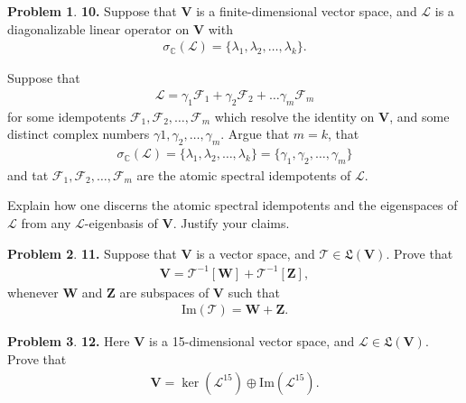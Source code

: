 \documentclass{book}
\theoremstyle{definition}
\newtheorem*{prob*}{Problem}
\newcommand{\F}{\mathcal{F}}
\newcommand{\V}{\mathbf{V}}
\newcommand{\W}{\mathbf{W}}
\newcommand{\Z}{\mathbf{Z}}
\newcommand{\lag}{\mathcal{L}}
\newcommand{\ima}{\text{Im}}
\newcommand{\T}{\mathcal{T}}
\newcommand{\LL}{\mathfrak{L}}
\begin{document}
\begin{prob*}\textbf{10.} Suppose that $\V$ is a finite-dimensional vector space, and $\lag$ is a diagonalizable linear operator on $\V$ with
	\begin{align*}
	\sigma_\mathbb{C}(\lag) = \{ \lambda_1, \lambda_2, \dots ,  \lambda_k\}.
	\end{align*}
	
	
	\item Suppose that 
	\begin{align*}
	\lag = \gamma_1 \F_1 + \gamma_2 \F_2 + \dots \gamma_m \F_m
	\end{align*}
	for some idempotents $\F_1, \F_2, \dots, \F_m$ which resolve the identity on $\V$, and some distinct complex numbers $\gamma1, \gamma_2, \dots, \gamma_m$. Argue that $m=k$, that 
	\begin{align*}
	\sigma_\mathbb{C}(\lag) = \{ \lambda_1, \lambda_2, \dots, \lambda_k \} = \{ \gamma_1, \gamma_2, \dots, \gamma_m \}
	\end{align*} 
	and tat $\F_1, \F_2, \dots, \F_m$ are the atomic spectral idempotents of $\lag$.
	
	
	
	\item Explain how one discerns the atomic spectral idempotents and the eigenspaces of $\lag$ from any $\lag$-eigenbasis of $\V$. Justify your claims. 
\end{prob*}




\newpage



\begin{prob*}\textbf{11.} Suppose that $\V$ is a vector space, and $\T \in \LL(\V)$. Prove that 
	\begin{align*}
	\V = \T^{-1}[\W] + \T^{-1}[\Z],
	\end{align*}
	whenever $\W$ and $\Z$ are subspaces of $\V$ such that 
	\begin{align*}
	\ima(\T) = \W + \Z.
	\end{align*}
	
\end{prob*}



\newpage



\begin{prob*}\textbf{12.} Here $\V$ is a 15-dimensional vector space, and $\lag \in \LL(\V)$. Prove that 
	\begin{align*}
	\V = \ker(\lag^{15}) \oplus \ima(\lag^{15}).
	\end{align*}
\end{prob*}
\end{document}
